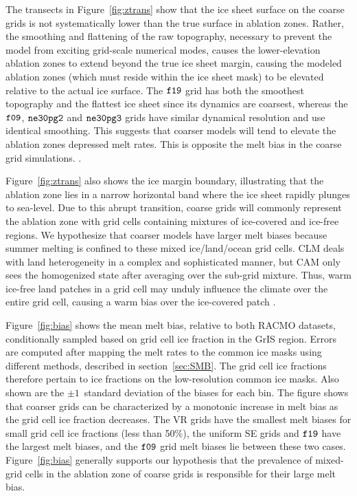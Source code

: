 \documentclass[draft]{agujournal2019}
\begin{document}
The transects in Figure~\ref{fig:ztrans} show that the ice sheet surface on the coarse grids is not systematically lower than the true surface in ablation zones. Rather, the smoothing and flattening of the raw topography, necessary to prevent the model from exciting grid-scale numerical modes, causes the lower-elevation ablation zones to extend beyond the true ice sheet margin, causing the modeled ablation zones (which must reside within the ice sheet mask) to be elevated relative to the actual ice surface. The $\tt f19$ grid has both the smoothest topography and the flattest ice sheet since its dynamics are coarsest, whereas the $\tt f09$, $\tt ne30pg2$ and $\tt ne30pg3$ grids have similar dynamical resolution and use identical smoothing. This suggests that coarser models will tend to elevate the ablation zones {\color{blue}{relative to where they should be, which may be expected to cause anomalous (adiabatic) cooling and}} depressed melt rates.  This is opposite the melt bias in the coarse grid simulations. {\color{blue}{Also, the EC downscaling should be able to correct for situations where model ice surface is elevated relative to the true ice surface, although for very large elevation differences or errors, the EC scheme may not be adequate}}.

Figure~\ref{fig:ztrans} also shows the ice margin boundary, illustrating that the ablation zone lies in a narrow horizontal band where the ice sheet rapidly plunges to sea-level. Due to this abrupt transition, coarse grids will commonly represent the ablation zone with grid cells containing mixtures of ice-covered and ice-free regions. We hypothesize that coarser models have larger melt biases because summer melting is confined to these mixed ice/land/ocean grid cells. CLM deals with land heterogeneity in a complex and sophisticated manner, but CAM only sees the homogenized state after {\color{blue}{area-}}averaging over the sub-grid mixture. Thus, warm ice-free land patches in a grid cell may unduly influence the climate over the entire grid cell, causing a warm bias over the ice-covered patch {\color{blue}{and more melting}}.

Figure~\ref{fig:bias} shows the mean melt bias, relative to both RACMO datasets, conditionally sampled based on grid cell ice fraction in the GrIS region. Errors are computed after mapping the melt rates to the common ice masks using different methods, described in section~\ref{sec:SMB}. The grid cell ice fractions therefore pertain to ice fractions on the low-resolution common ice masks. Also shown are the $\pm 1$~standard deviation of the biases for each bin. The figure shows that coarser grids can be characterized by a monotonic increase in melt bias as the grid cell ice fraction decreases. The VR grids have the smallest melt biases for small grid cell ice fractions (less than 50\%), the {\color{blue}{quasi-}}uniform SE grids and $\tt f19$ have the largest melt biases, and the $\tt f09$ grid melt biases lie between these two cases. Figure~\ref{fig:bias} generally supports our hypothesis that the prevalence of mixed-grid cells in the ablation zone of coarse grids is responsible for their large melt bias.
\end{document}
